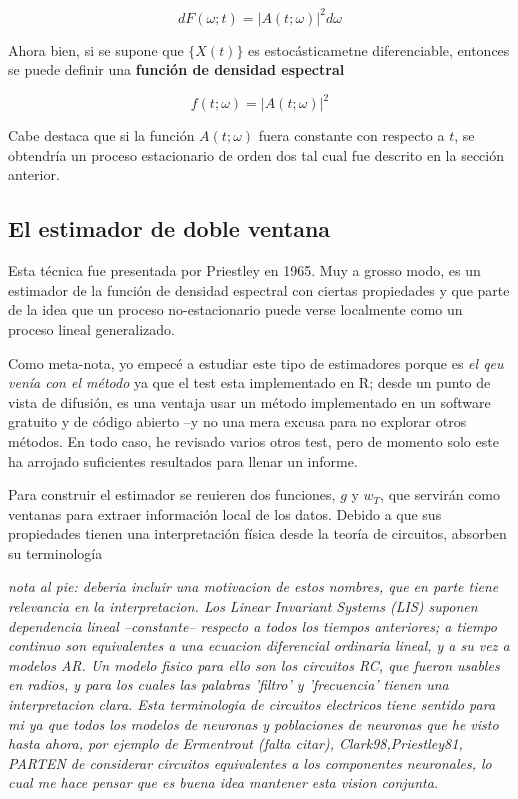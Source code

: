 \begin{equation*}
d F(\omega;t) = \lvert A(t;\omega) \lvert^{2} d\omega
\end{equation*}

Ahora bien, si se supone que $\{X(t)\}$ es estoc\'asticametne diferenciable, entonces
se puede definir una \textbf{funci\'on de densidad espectral}

\begin{equation*}
f(t;\omega) = \lvert A(t;\omega) \lvert^{2}
\end{equation*}

Cabe destaca que si la funci\'on $A(t;\omega)$ fuera constante con respecto a $t$, se obtendr\'ia
un proceso estacionario de orden dos tal cual fue descrito en la secci\'on anterior.


\subsection{El estimador de doble ventana}

Esta t\'ecnica fue presentada por Priestley en 1965. Muy a grosso modo, es un estimador de la
funci\'on de densidad espectral con ciertas propiedades y que parte de la idea que un proceso
no-estacionario puede verse localmente como un proceso lineal generalizado.

Como meta-nota, yo empec\'e a estudiar este tipo de estimadores porque es \textit{el qeu ven\'ia
con el m\'etodo} ya que el test esta implementado en R; desde un punto de vista de difusi\'on,
es una ventaja usar un m\'etodo implementado en un software gratuito y de c\'odigo abierto --y
no una mera excusa para no explorar otros m\'etodos. En todo caso, he revisado varios otros test,
pero de momento solo este ha arrojado suficientes resultados para llenar un informe.

Para construir el estimador se reuieren dos funciones, $g$ y $w_T$, que servir\'an como ventanas
para extraer informaci\'on local de los datos. Debido a que sus propiedades tienen una interpretaci\'on
f\'isica desde la teor\'ia de circuitos, absorben su terminolog\'ia

\textit{
nota al pie: deberia incluir una motivacion de estos nombres,
que en parte tiene relevancia en la interpretacion. Los 
Linear Invariant Systems (LIS) suponen dependencia lineal
--constante-- respecto a todos los tiempos anteriores; 
a tiempo continuo son equivalentes a una ecuacion diferencial ordinaria lineal,
y a su vez a modelos AR. Un modelo fisico para ello son los circuitos RC, que
fueron usables en radios, y para los cuales las palabras 'filtro' y 'frecuencia'
tienen una interpretacion clara. Esta terminologia de circuitos electricos tiene sentido
para mi ya que todos los modelos de neuronas y poblaciones de neuronas que he visto hasta ahora,
por ejemplo de Ermentrout (falta citar), {Clark98,Priestley81}, PARTEN de considerar
circuitos equivalentes a los componentes neuronales, lo cual me hace pensar que es buena idea
mantener esta vision conjunta.
}

